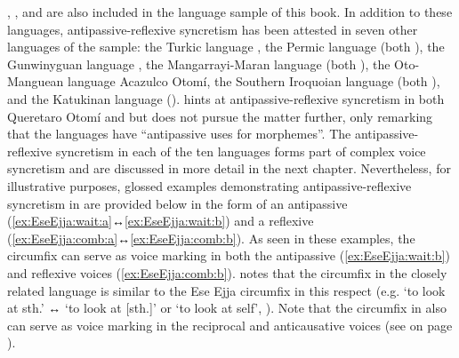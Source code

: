 , , and  are also included in the language sample of this book. In addition to these languages, antipassive-reflexive syncretism has been attested in seven other languages of the sample: the Turkic language , the Permic language  (both ), the Gunwinyguan language , the Mangarrayi-Maran language  (both ), the Oto-Man\-guean language Acazulco Otomí, the Southern Iroquoian language  (both ), and the Katukinan language  (). \cite[169]{heaton:2017} hints at antipassive-reflexive syncretism in both Queretaro Otomí and  but does not pursue the matter further, only remarking that the languages have “antipassive uses for  morphemes”. The antipassive-reflexive syncretism in each of the ten languages forms part of complex voice syncretism and are discussed in more detail in the next chapter. Nevertheless, for illustrative purposes, glossed examples demonstrating antipassive-reflexive syncretism in  are provided below in the form of an antipassive  (\ref{ex:EseEjja:wait:a}↔\ref{ex:EseEjja:wait:b}) and a reflexive  (\ref{ex:EseEjja:comb:a}↔\ref{ex:EseEjja:comb:b}). As seen in these examples, the circumfix  can serve as voice marking in both the antipassive (\ref{ex:EseEjja:wait:b}) and reflexive voices (\ref{ex:EseEjja:comb:b}). \cite[162]{janic:2010} notes that the circumfix  in the closely related language  is similar to the Ese Ejja circumfix  in this respect (e.g.  ‘to look at sth.’ ↔  ‘to look at [sth.]’ or ‘to look at self’, \citealt[268]{guillaume:2008}). Note that the circumfix in  also can serve as voice marking in the reciprocal and anticausative voices (see  on page \pageref{tab:ch5:antp-refl-recp-antc}). 

